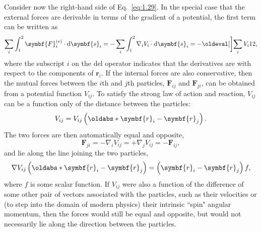 Consider now the right-hand side of Eq.~\eqref{eq:1.29}. In the special case that the external forces are derivable in terms of the gradient of a potential, the first term can be written as
\begin{equation*}
    \sum_i\int_1^2\symbf{F}_i^{\left(e\right)}\cdot\odif{\symbf{s}_i}=-\sum_i\int_1^2\nabla_iV_i\cdot\odif{\symbf{s}_i}=-\eval[\bigg]{\sum_iV_i}[1][2],
\end{equation*}
where the subscript \(i\) on the del operator indicates that the derivatives are with respect to the components of \(\symbf{r}_i\). If the internal forces are also conservative, then the mutual forces between the \(i\)th and \(j\)th particles, \(\symbf{F}_{ij}\) and \(\symbf{F}_{ji}\), can be obtained from a potential function \(V_{ij}\). To satisfy the strong law of action and reaction, \(V_{ij}\) can be a function only of the distance between the particles:
\begin{equation}
    V_{ij}=V_{ij}\left(\abs[\symbf{r}_i-\symbf{r}_j]\right).
\end{equation}
The two forces are then automatically equal and opposite,
\begin{equation}
    \symbf{F}_{ji}=-\nabla_iV_{ij}=+\nabla_jV_{ij}=-\symbf{F}_{ij},
\end{equation}
and lie along the line joining the two particles,
\begin{equation}
    \nabla V_{ij}\left(\abs[\symbf{r}_i-\symbf{r}_j]\right)=\left(\symbf{r}_i-\symbf{r}_j\right)f,
\end{equation}
where \(f\) is some scalar function. If \(V_{ij}\) were also a function of the difference of some other pair of vectors associated with the particles, such as their velocities or (to step into the domain of modern physics) their intrinsic ``spin" angular momentum, then the forces would still be equal and opposite, but would not necessarily lie along the direction between the particles.

